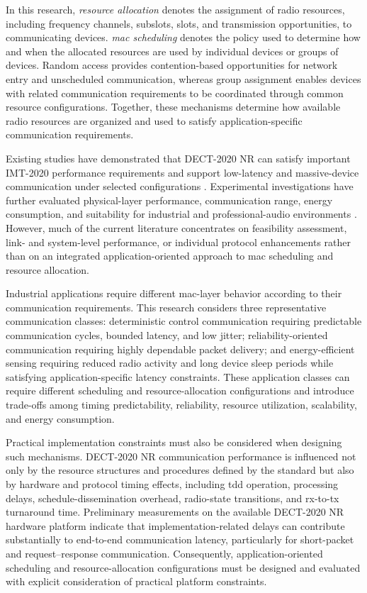 \documentclass[12pt,a4paper]{article}
\begin{document}
In this research, \textit{resource allocation} denotes the assignment of radio resources, including frequency channels, subslots, slots, and transmission opportunities, to communicating devices. \textit{\gls{mac} scheduling} denotes the policy used to determine how and when the allocated resources are used by individual devices or groups of devices. Random access provides contention-based opportunities for network entry and unscheduled communication, whereas group assignment enables devices with related communication requirements to be coordinated through common resource configurations. Together, these mechanisms determine how available radio resources are organized and used to satisfy application-specific communication requirements.

Existing studies have demonstrated that DECT-2020 NR can satisfy important IMT-2020 performance requirements and support low-latency and massive-device communication under selected configurations \cite{dhanwaniAssessmentCandidateTechnology2020,pennerURLLCPerformanceEvaluation2021,smidaETSIDECT2020Component2023}. Experimental investigations have further evaluated physical-layer performance, communication range, energy consumption, and suitability for industrial and professional-audio environments \cite{wassmannPerformanceDECT2020NR2024,haqueDECT2020NRLink2025,grafWhatExpectWhen2026,durreDECT2020NRProfessional2024}. However, much of the current literature concentrates on feasibility assessment, link- and system-level performance, or individual protocol enhancements rather than on an integrated application-oriented approach to \gls{mac} scheduling and resource allocation.

Industrial applications require different \gls{mac}-layer behavior according to their communication requirements. This research considers three representative communication classes: deterministic control communication requiring predictable communication cycles, bounded latency, and low jitter; reliability-oriented communication requiring highly dependable packet delivery; and energy-efficient sensing requiring reduced radio activity and long device sleep periods while satisfying application-specific latency constraints. These application classes can require different scheduling and resource-allocation configurations and introduce trade-offs among timing predictability, reliability, resource utilization, scalability, and energy consumption.

Practical implementation constraints must also be considered when designing such mechanisms. DECT-2020 NR communication performance is influenced not only by the resource structures and procedures defined by the standard but also by hardware and protocol timing effects, including \gls{tdd} operation, processing delays, schedule-dissemination overhead, radio-state transitions, and \gls{rx}-to-\gls{tx} turnaround time. Preliminary measurements on the available DECT-2020 NR hardware platform indicate that implementation-related delays can contribute substantially to end-to-end communication latency, particularly for short-packet and request--response communication. Consequently, application-oriented scheduling and resource-allocation configurations must be designed and evaluated with explicit consideration of practical platform constraints.
\end{document}
